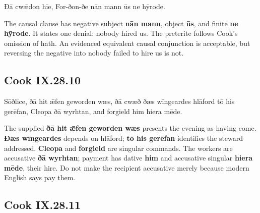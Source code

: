 \par\begin{minipage}{\linewidth}\raggedright
Ðā cwǣdon hīe, For-ðon-ðe nān mann ūs ne hȳrode.

The causal clause has negative subject \textbf{nān mann}, object \textbf{ūs}, and finite \textbf{ne hȳrode}. It states one denial: nobody hired us. The preterite follows Cook’s omission of hath. An evidenced equivalent causal conjunction is acceptable, but reversing the negative into nobody failed to hire us is not.

\end{minipage}\par\addvspace{4pt}

\subsection*{Cook IX.28.10}

\par\begin{minipage}{\linewidth}\raggedright
Sōðlice, ðā hit ǣfen geworden wæs, ðā cwæð ðæs wīngeardes hlāford tō his gerēfan, Cleopa ðā wyrhtan, and forgield him hiera mēde.

The supplied \textbf{ðā hit ǣfen geworden wæs} presents the evening as having come. \textbf{Ðæs wīngeardes} depends on hlāford; \textbf{tō his gerēfan} identifies the steward addressed. \textbf{Cleopa} and \textbf{forgield} are singular commands. The workers are accusative \textbf{ðā wyrhtan}; payment has dative \textbf{him} and accusative singular \textbf{hiera mēde}, their hire. Do not make the recipient accusative merely because modern English says pay them.

\end{minipage}\par\addvspace{4pt}

\subsection*{Cook IX.28.11}

